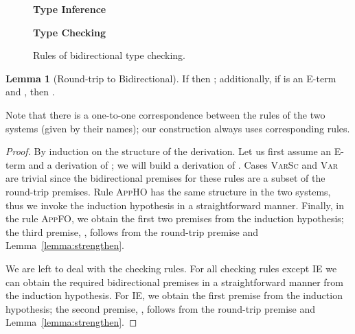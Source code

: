 \documentclass[10pt,preprint]{sigplanconf-pldi16}
\theoremstyle{definition}
\newtheorem{lemma}{Lemma}
\begin{document}
\begin{figure}
\small
\textbf{Type Inference}\quad


\textbf{Type Checking}\quad

\caption{Rules of bidirectional type checking.}\label{fig:bidir}
\end{figure}

\begin{lemma}[Round-trip to Bidirectional]\label{lemma:rt-to-bidir}
If  then ;
additionally, if  is an E-term and ,
then .
\end{lemma}
Note that there is a one-to-one correspondence between the rules of the two systems (given by their names);
our construction always uses corresponding rules.
\begin{proof}
By induction on the structure of the derivation.
Let us first assume an E-term  and a derivation of ;
we will build a derivation of .
Cases \textsc{VarSc} and \textsc{Var} are trivial
since the bidirectional premises for these rules are a subset of the round-trip premises.
Rule \textsc{AppHO} has the same structure in the two systems,
thus we invoke the induction hypothesis in a straightforward manner.
Finally, in the rule \textsc{AppFO}, we obtain the first two premises from the induction hypothesis;
the third premise, ,
follows from the round-trip premise 
and Lemma~\ref{lemma:strengthen}.

We are left to deal with the checking rules.
For all checking rules except \textsc{IE} we can obtain the required bidirectional premises
in a straightforward manner from the induction hypothesis.
For \textsc{IE}, we obtain the first premise from the induction hypothesis;
the second premise, ,
follows from the round-trip premise 
and Lemma~\ref{lemma:strengthen}.
\end{proof}
\end{document}
